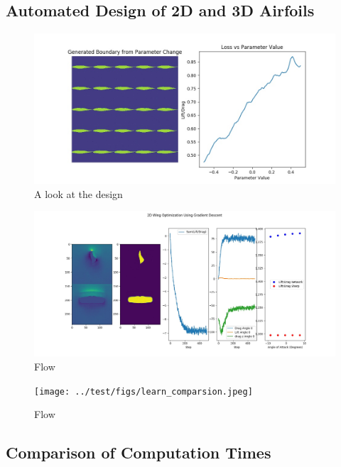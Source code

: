 \documentclass{article} %
\begin{document}
\subsection{Automated Design of 2D and 3D Airfoils}

\begin{figure}[h]
\begin{center}
\includegraphics[scale=0.27]{../test/figs/boundary_space_explore.jpeg}
\end{center}
\caption{A look at the design }
\end{figure}

\begin{figure}[h]
\begin{center}
\includegraphics[scale=0.20]{../test/figs/learn_gradient_descent.jpeg}
\end{center}
\caption{Flow}
\end{figure}

\begin{figure}[h]
\begin{center}
\texttt{[image: ../test/figs/learn\_comparsion.jpeg]}
\end{center}
\caption{Flow}
\end{figure}

\subsection{Comparison of Computation Times}
\end{document}
